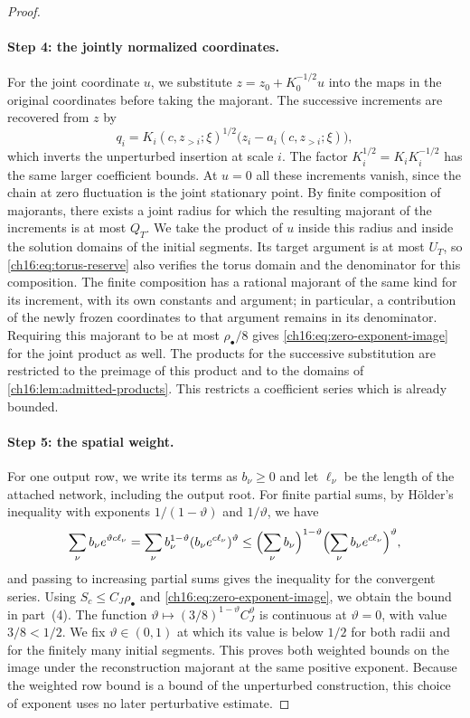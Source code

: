 \begin{proof}
\paragraph{Step 4: the jointly normalized coordinates.}
For the joint coordinate $u$, we substitute $z=z_0+K_0^{-1/2}u$ into the maps in the original coordinates before taking the majorant. The successive increments are recovered from $z$ by
\[
 q_i=K_i(c,z_{>i};\xi)^{1/2}
                       \bigl(z_i-a_i(c,z_{>i};\xi)\bigr),
\]
which inverts the unperturbed insertion at scale $i$. The factor $K_i^{1/2}=K_iK_i^{-1/2}$ has the same larger coefficient bounds. At $u=0$ all these increments vanish, since the chain at zero fluctuation is the joint stationary point. By finite composition of majorants, there exists a joint radius for which the resulting majorant of the increments is at most $Q_T$. We take the product of $u$ inside this radius and inside the solution domains of the initial segments. Its target argument is at most $U_T$, so \eqref{ch16:eq:torus-reserve} also verifies the torus domain and the denominator for this composition. The finite composition has a rational majorant of the same kind for its increment, with its own constants and argument; in particular, a contribution of the newly frozen coordinates to that argument remains in its denominator. Requiring this majorant to be at most $\rho_\bullet/8$ gives \eqref{ch16:eq:zero-exponent-image} for the joint product as well. The products for the successive substitution are restricted to the preimage of this product and to the domains of \cref{ch16:lem:admitted-products}. This restricts a coefficient series which is already bounded.

\paragraph{Step 5: the spatial weight.}
For one output row, we write its terms as $b_\nu\ge0$ and let $\ell_\nu$ be the length of the attached network, including the output root. For finite partial sums, by Hölder's inequality with exponents $1/(1-\vartheta)$ and $1/\vartheta$, we have
\[
 \sum_\nu b_\nu e^{\vartheta c\ell_\nu}
 =\sum_\nu b_\nu^{1-\vartheta}
                   (b_\nu e^{c\ell_\nu})^\vartheta
 \le\Bigl(\sum_\nu b_\nu\Bigr)^{1-\vartheta}
        \Bigl(\sum_\nu b_\nu e^{c\ell_\nu}\Bigr)^\vartheta,
\]
and passing to increasing partial sums gives the inequality for the convergent series. Using $S_c\le C_J\rho_\bullet$ and \eqref{ch16:eq:zero-exponent-image}, we obtain the bound in part~(4). The function $\vartheta\mapsto(3/8)^{1-\vartheta}C_J^\vartheta$ is continuous at $\vartheta=0$, with value $3/8<1/2$. We fix $\vartheta\in(0,1)$ at which its value is below $1/2$ for both radii and for the finitely many initial segments. This proves both weighted bounds on the image under the reconstruction majorant at the same positive exponent. Because the weighted row bound is a bound of the unperturbed construction, this choice of exponent uses no later perturbative estimate.


\end{proof}
